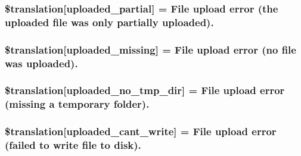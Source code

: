 \subsubsection[{\$translation}]{\setlength{\rightskip}{0pt plus 5cm}\$translation\mbox{[}\textquotesingle{}uploaded\+\_\+partial\textquotesingle{}\mbox{]} = \textquotesingle{}File {\bf upload} error (the uploaded file was only partially uploaded).\textquotesingle{}}\label{class_8upload_8xx___x_x_8php_a967c17da21b0a2d3bd65cca3a9ca0ea8}
\hypertarget{class_8upload_8xx___x_x_8php_a0cce433260be65f1f35853a6b4b8952b}{}
\subsubsection[{\$translation}]{\setlength{\rightskip}{0pt plus 5cm}\$translation\mbox{[}\textquotesingle{}uploaded\+\_\+missing\textquotesingle{}\mbox{]} = \textquotesingle{}File {\bf upload} error (no file was uploaded).\textquotesingle{}}\label{class_8upload_8xx___x_x_8php_a0cce433260be65f1f35853a6b4b8952b}
\hypertarget{class_8upload_8xx___x_x_8php_ae3cdc68fe248399f77246c91b0555341}{}
\subsubsection[{\$translation}]{\setlength{\rightskip}{0pt plus 5cm}\$translation\mbox{[}\textquotesingle{}uploaded\+\_\+no\+\_\+tmp\+\_\+dir\textquotesingle{}\mbox{]} = \textquotesingle{}File {\bf upload} error (missing a temporary folder).\textquotesingle{}}\label{class_8upload_8xx___x_x_8php_ae3cdc68fe248399f77246c91b0555341}
\hypertarget{class_8upload_8xx___x_x_8php_af368fee3b41bc05e6b208c1557a00c00}{}
\subsubsection[{\$translation}]{\setlength{\rightskip}{0pt plus 5cm}\$translation\mbox{[}\textquotesingle{}uploaded\+\_\+cant\+\_\+write\textquotesingle{}\mbox{]} = \textquotesingle{}File {\bf upload} error (failed to write file to disk).\textquotesingle{}}\label{class_8upload_8xx___x_x_8php_af368fee3b41bc05e6b208c1557a00c00}
\hypertarget{class_8upload_8xx___x_x_8php_a01c69a4c8556602b3892dce727bace11}{}
